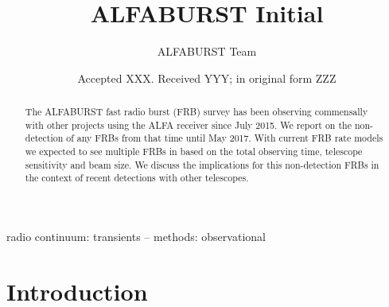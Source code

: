 \documentclass[a4paper,fleqn,usenatbib]{mnras}
\title[ALFABURST Initial]{ALFABURST Initial}
\author[ALFABURST Team]{
ALFABURST Team
}
\date{Accepted XXX. Received YYY; in original form ZZZ}
\begin{document}
\label{firstpage}
\pagerange{\pageref{firstpage}--\pageref{lastpage}}
\maketitle

\begin{abstract}
The ALFABURST fast radio burst (FRB) survey has been observing commensally with
other projects using the ALFA receiver since July 2015. We report on the
non-detection of any FRBs from that time until May 2017. With current FRB rate
models we expected to see multiple FRBs in based on the total observing time,
telescope sensitivity and beam size. We discuss the implications for this
non-detection FRBs in the context of recent detections with other telescopes.
\end{abstract}

\begin{keywords}
radio continuum: transients -- methods: observational
\end{keywords}



\section{Introduction}
\end{document}
